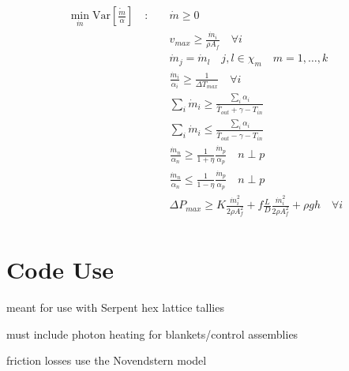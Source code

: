 \documentclass[11pt, oneside]{article}   	%
\newcommand{\Var}{\mathrm{Var}}
\begin{document}
\begin{align*}
\min_{\dot{m}} \Var [\dot{\frac{m}{\alpha}}] \quad : \quad & \dot{m} \geq 0 \\
& v_{max} \geq \frac{\dot{m}_i}{\rho A_f} \quad \forall i \\
& \dot{m}_j = \dot{m}_l \quad  j,l \in \chi_m \quad m = 1, \dots, k \\
& \frac{\dot{m}_i}{\alpha_i} \geq \frac{1}{\Delta T_{max}} \quad \forall i \\
& \sum_{i} \dot{m}_i \geq \frac{\sum_{i} \alpha_i}{\bar{T}_{out} + \gamma - T_{in}} \\
& \sum_{i} \dot{m}_i \leq \frac{\sum_{i} \alpha_i}{\bar{T}_{out} - \gamma - T_{in}} \\
& \frac{\dot{m}_n}{\alpha_n} \geq \frac{1}{1+\eta} \frac{\dot{m}_p}{\alpha_p} \quad n \perp p \\
& \frac{\dot{m}_n}{\alpha_n} \leq \frac{1}{1-\eta} \frac{\dot{m}_p}{\alpha_p} \quad n \perp p \\
& \Delta P_{max} \geq K \frac{\dot{m}_i^2}{2 \rho A_f^2} + f \frac{L}{D} \frac{\dot{m}_i^2}{2 \rho A_f^2} + \rho g h \quad \forall i \\
\end{align*}

\section{Code Use}

meant for use with Serpent hex lattice tallies

must include photon heating for blankets/control assemblies

friction losses use the Novendstern model

\begin{thebibliography}{9}


\end{thebibliography}
\end{document}

